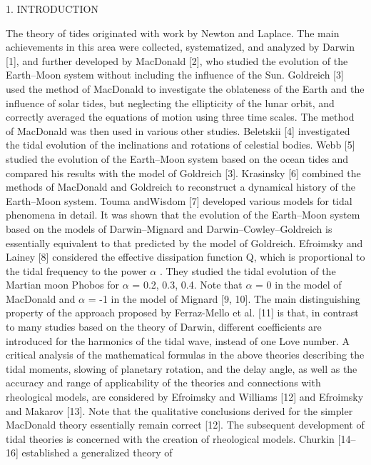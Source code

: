 \documentclass[12pt]{article}
\begin{document}
\begin{multicols}{2}
\begin{center}
 1. INTRODUCTION
\end{center}
The theory of tides originated with work by Newton
and Laplace. The main achievements in this
area were collected, systematized, and analyzed by
Darwin [1], and further developed by MacDonald [2],
who studied the evolution of the Earth–Moon system
without including the influence of the Sun. Goldreich
[3] used the method of MacDonald to investigate the
oblateness of the Earth and the influence of solar
tides, but neglecting the ellipticity of the lunar orbit,
and correctly averaged the equations of motion using
three time scales.
The method of MacDonald was then used in various
other studies. Beletskii [4] investigated the tidal
evolution of the inclinations and rotations of celestial
bodies. Webb [5] studied the evolution of the
Earth–Moon system based on the ocean tides and
compared his results with the model of Goldreich [3].
Krasinsky [6] combined the methods of MacDonald
and Goldreich to reconstruct a dynamical history of
the Earth–Moon system. Touma andWisdom [7] developed
various models for tidal phenomena in detail.
It was shown that the evolution of the Earth–Moon
system based on the models of Darwin–Mignard and
Darwin–Cowley–Goldreich is essentially equivalent
to that predicted by the model of Goldreich.
Efroimsky and Lainey [8] considered the effective
dissipation function Q, which is proportional to the
tidal frequency to the power $\alpha$ . They studied the tidal
evolution of the Martian moon Phobos for $\alpha$ = 0.2,
0.3, 0.4. Note that $\alpha$ = 0 in the model of MacDonald
and $\alpha$ = -1 in the model of Mignard [9, 10]. The
main distinguishing property of the approach proposed
by Ferraz-Mello et al. [11] is that, in contrast to
many studies based on the theory of Darwin, different
coefficients are introduced for the harmonics of the
tidal wave, instead of one Love number. A critical
analysis of the mathematical formulas in the above
theories describing the tidal moments, slowing of
planetary rotation, and the delay angle, as well as the
accuracy and range of applicability of the theories and
connections with rheological models, are considered
by Efroimsky and Williams [12] and Efroimsky and
Makarov [13]. Note that the qualitative conclusions
derived for the simpler MacDonald theory essentially
remain correct [12].
The subsequent development of tidal theories is
concerned with the creation of rheological models.
Churkin [14–16] established a generalized theory of

\end{multicols}
\end{document}
